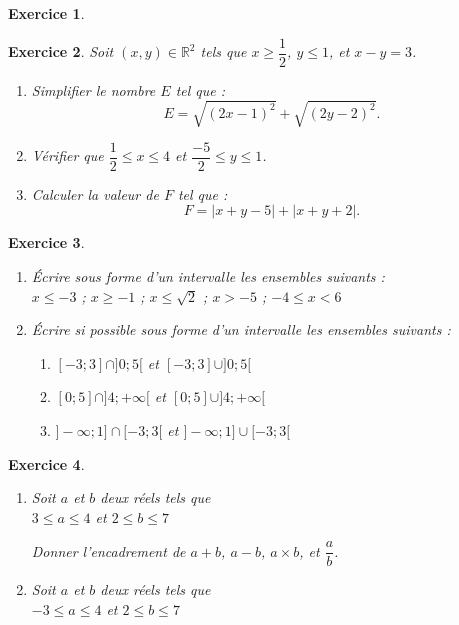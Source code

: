 \documentclass[12pt,a4paper]{article}
\theoremstyle{mystyle}
\newtheorem{exo}{Exercice}
\begin{document}
\begin{multicols*}{2}
\begin{exo}
\end{exo}

\begin{exo}
Soit \((x, y) \in \mathbb{R}^2\) tels que \( x \geq \dfrac{1}{2} \), \( y \leq 1 \), et \( x - y = 3 \).  
   	\begin{enumerate}
        \item Simplifier le nombre \( E \) tel que : 
        $$E = \sqrt{(2x - 1)^2} + \sqrt{(2y - 2)^2}.$$
        \item Vérifier que \( \dfrac{1}{2} \leq x \leq 4 \) et \( \dfrac{-5}{2} \leq y \leq 1 \).
        \item Calculer la valeur de \( F \) tel que :  
        \[
        F = |x+y-5| + |x+y+2|.
        \]
	\end{enumerate}
\end{exo}

\begin{exo}
\text{ }
\begin{enumerate}
    \item Écrire sous forme d'un intervalle les ensembles suivants :\\
         $x \leq -3$ ; $x \geq -1$ ; $x \leq \sqrt{2}$ ; $x > -5$ ; $-4 \leq x < 6$

    \item Écrire si possible sous forme d'un intervalle les ensembles suivants :
    \begin{enumerate}
        \item $[-3;3] \cap ]0;5[$ et $[-3;3] \cup ]0;5[$
        \item $[0;5] \cap ]4;+\infty[$ et $[0;5] \cup ]4;+\infty[$
        \item $]-\infty;1] \cap [-3;3[$ et $]-\infty;1] \cup [-3;3[$
    \end{enumerate}
\end{enumerate}
\end{exo}

\begin{exo}
\text{ }
\begin{enumerate}
    \item Soit $a$ et $b$ deux réels tels que \\
    $3 \leq a \leq 4$ et $2 \leq b \leq 7$
 	
 	Donner l'encadrement de $a + b$, $a - b$, $a \times b$, et $\dfrac{a}{b}$.
    \item Soit $a$ et $b$ deux réels tels que \\
    $-3 \leq a \leq 4$ et $2 \leq b \leq 7$
    

\end{enumerate}
\end{exo}
\end{multicols*}
\end{document}
